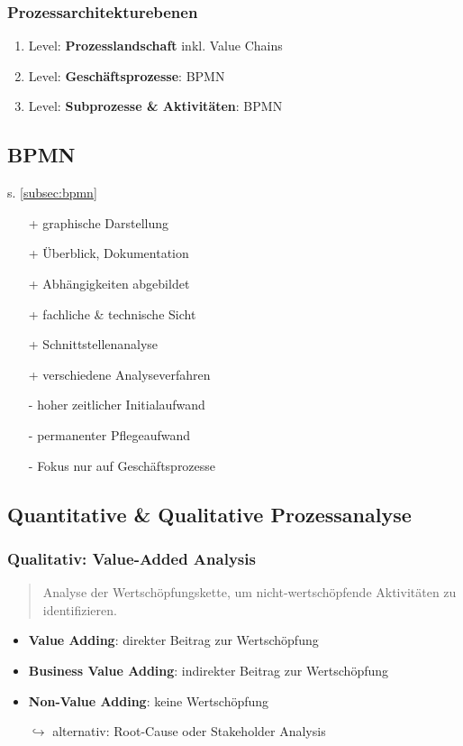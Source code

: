 \documentclass{article}
\begin{document}
\subsubsection{Prozessarchitekturebenen}
\begin{enumerate}
  \item Level: \textbf{Prozesslandschaft} inkl. Value Chains
  \item Level: \textbf{Geschäftsprozesse}: BPMN
  \item Level: \textbf{Subprozesse \& Aktivitäten}: BPMN
\end{enumerate}

\subsection{BPMN}

s. \ref{subsec:bpmn}

\begin{itemize}
  \item[+] graphische Darstellung
  \item[+] Überblick, Dokumentation
  \item[+] Abhängigkeiten abgebildet
  \item[+] fachliche \& technische Sicht
  \item[+] Schnittstellenanalyse
  \item[+] verschiedene Analyseverfahren
  \item[-] hoher zeitlicher Initialaufwand
  \item[-] permanenter Pflegeaufwand
  \item[-] Fokus nur auf Geschäftsprozesse
\end{itemize}

\subsection{Quantitative \& Qualitative Prozessanalyse}

\subsubsection{Qualitativ: Value-Added Analysis}
\begin{quote}Analyse der Wertschöpfungskette, um nicht-wertschöpfende Aktivitäten zu identifizieren.\end{quote}
\begin{itemize}
  \item \textbf{Value Adding}: direkter Beitrag zur Wertschöpfung
  \item \textbf{Business Value Adding}: indirekter Beitrag zur Wertschöpfung
  \item \textbf{Non-Value Adding}: keine Wertschöpfung
  \item[$\hookrightarrow$] alternativ: Root-Cause oder Stakeholder Analysis
\end{itemize}
\end{document}
